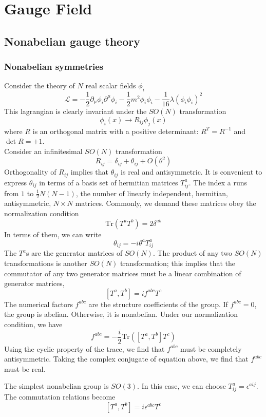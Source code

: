 \documentclass[cyan]{elegantnote}
\author{Yuyang Songsheng}
\begin{document}
\maketitle
\tableofcontents
\chapter{Gauge Field}
\section{Nonabelian gauge theory}
\subsection{Nonabelian symmetries}
Consider the theory of $N$ real scalar fields $\phi_i$
\[\mathcal{L} = -\frac{1}{2}\partial_{\mu}\phi_i \partial^{\mu}\phi_i - \frac{1}{2}m^2\phi_i\phi_i - \frac{1}{16}\lambda(\phi_i\phi_i)^2\]
This lagrangian is clearly invariant under the $SO(N)$ transformation
\[\phi_i(x) \to R_{ij}\phi_j(x)\]
where $R$ is an orthogonal matrix with a positive determinant: $R^T = R^{-1}$ and $\det R = +1$.
\\
Consider an infinitesimal $SO(N)$ transformation
\[R_{ij} = \delta_{ij} + \theta_{ij} + O(\theta^2)\]
Orthogonality of $R_{ij}$ implies that $\theta_{ij}$ is real and antisymmetric. It is convenient to express $\theta_{ij}$ in terms of a basis set of hermitian matrices $T^a_{ij}$. The index a runs from $1$ to $\frac{1}{2}N(N-1)$, the number of linearly independent, hermitian, antisymmetric, $N \times N$ matrices. Commonly, we demand these matrices obey the normalization condition
\[\mathrm{Tr}(T^a T^b) = 2\delta^{ab}\]
In terms of them, we can write
\[\theta_{ij} = -i\theta^a T^a_{ij}\]
The $T^a$s are the generator matrices of $SO(N)$. The product of any two $SO(N)$ transformations is another $SO(N)$ transformation; this implies that the commutator of any two generator matrices must be a linear combination of generator matrices,
\[[T^a,T^b] = if^{abc}T^c\]
The numerical factors $f^{abc}$ are the structure coefficients of the group. If $f^{abc} = 0$, the group is abelian. Otherwise, it is nonabelian. Under our normalization condition, we have
\[f^{abc} = -\frac{i}{2} \mathrm{Tr} \left([T^a,T^b]T^c \right)\]
Using the cyclic property of the trace, we find that $f^{abc}$ must be completely antisymmetric. Taking the complex conjugate of equation above, we find that $f^{abc}$ must be real.

\begin{example}
The simplest nonabelian group is $SO(3)$. In this case, we can choose $T^a_{ij} = \epsilon^{aij}$. The commutation relations become
\[[T^a,T^b] = i\epsilon^{abc}T^c\]
\end{example}
\end{document}

